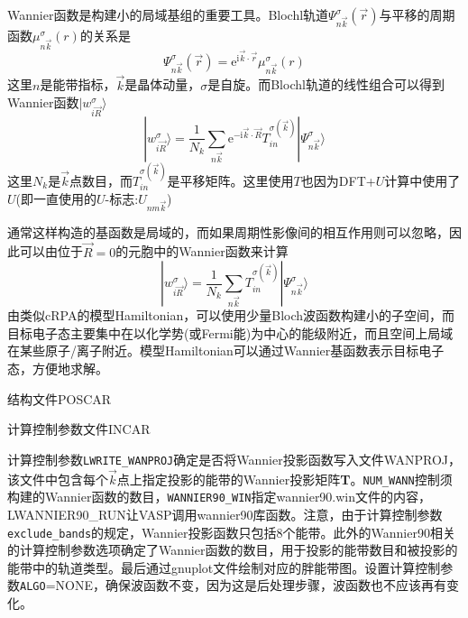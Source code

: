 \textrm{Wannier}函数是构建小的局域基组的重要工具。\textrm{Blochl}轨道$\Psi_{n\vec k}^{\sigma}(\vec r)$与平移的周期函数$\mu_{n\vec k}^{\sigma}(r)$的关系是
\begin{displaymath}
	\Psi_{n\vec k}^{\sigma}(\vec r)=\mathrm{e}^{\mathrm{i}\vec k\cdot\vec r}\mu_{n\vec k}^{\sigma}(r)
\end{displaymath}
这里$n$是能带指标，$\vec k$是晶体动量，$\sigma$是自旋。而\textrm{Blochl}轨道的线性组合可以得到\textrm{Wannier}函数$|w_{i\vec R}^{\sigma}\rangle$
\begin{displaymath}
	|w_{i\vec R}^{\sigma}\rangle=\dfrac1{N_k}\sum_{n\vec k}\mathrm{e}^{-\mathrm{i}\vec k\cdot\vec R}T_{in}^{\sigma(\vec k)}|\Psi_{n\vec k}^{\sigma}\rangle
\end{displaymath}
这里$N_k$是$\vec k$点数目，而$T_{in}^{\sigma(\vec k)}$是平移矩阵。这里使用$T$也因为\textrm{DFT+}$U$计算中使用了$U$(即一直使用的$U$-标志:$U_{nm\vec k}$)

通常这样构造的基函数是局域的，而如果周期性影像间的相互作用则可以忽略，因此可以由位于$\vec R=0$的元胞中的\textrm{Wannier}函数来计算
\begin{displaymath}
	|w_{i\vec R}^{\sigma}\rangle=\dfrac1{N_k}\sum_{n\vec k}T_{in}^{\sigma(\vec k)}|\Psi_{n\vec k}^{\sigma}\rangle
\end{displaymath}
由类似\textrm{cRPA}的模型\textrm{Hamiltonian}，可以使用少量\textrm{Bloch}波函数构建小的子空间，而目标电子态主要集中在以化学势(或\textrm{Fermi}能)为中心的能级附近，而且空间上局域在某些原子/离子附近。模型\textrm{Hamiltonian}可以通过\textrm{Wannier}基函数表示目标电子态，方便地求解。


结构文件\textrm{POSCAR}

计算控制参数文件\textrm{INCAR}

计算控制参数\texttt{LWRITE\_WANPROJ}确定是否将\textrm{Wannier}投影函数写入文件\textrm{WANPROJ}，该文件中包含每个$\vec k$点上指定投影的能带的\textrm{Wannier}投影矩阵\textbf{T}。\texttt{NUM\_WANN}控制须构建的\textrm{Wannier}函数的数目，\texttt{WANNIER90\_WIN}指定\textrm{wannier90.win}文件的内容，\textrm{LWANNIER90\_RUN}让\textrm{VASP}调用\textrm{wannier90}库函数。注意，由于计算控制参数\texttt{exclude\_bands}的规定，\textrm{Wannier}投影函数只包括8个能带。此外的\textrm{Wannier90}相关的计算控制参数选项确定了\textrm{Wannier}函数的数目，用于投影的能带数目和被投影的能带中的轨道类型。最后通过\textrm{gnuplot}文件绘制对应的胖能带图。设置计算控制参数\texttt{ALGO}=\textrm{NONE}，确保波函数不变，因为这是后处理步骤，波函数也不应该再有变化。

